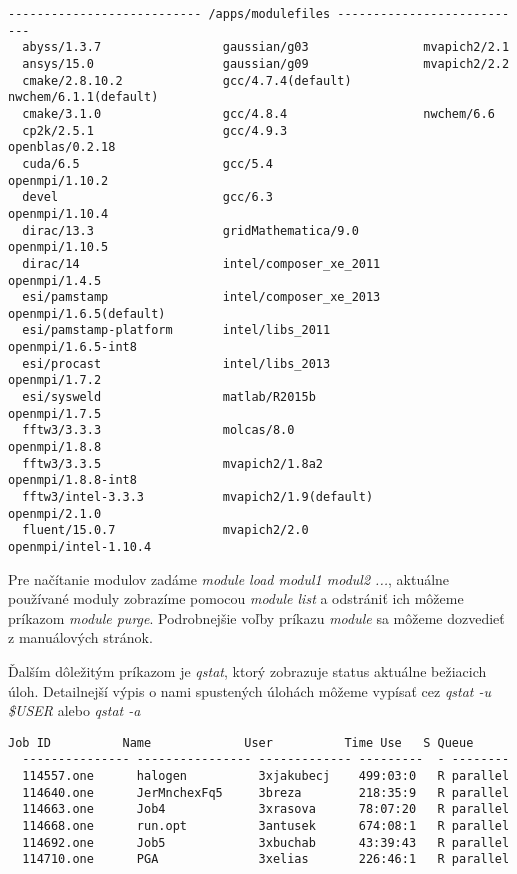 \begin{lstlisting}[caption={module avail}]
  --------------------------- /apps/modulefiles ---------------------------
  abyss/1.3.7                 gaussian/g03                mvapich2/2.1
  ansys/15.0                  gaussian/g09                mvapich2/2.2
  cmake/2.8.10.2              gcc/4.7.4(default)          nwchem/6.1.1(default)
  cmake/3.1.0                 gcc/4.8.4                   nwchem/6.6
  cp2k/2.5.1                  gcc/4.9.3                   openblas/0.2.18
  cuda/6.5                    gcc/5.4                     openmpi/1.10.2
  devel                       gcc/6.3                     openmpi/1.10.4
  dirac/13.3                  gridMathematica/9.0         openmpi/1.10.5
  dirac/14                    intel/composer_xe_2011      openmpi/1.4.5
  esi/pamstamp                intel/composer_xe_2013      openmpi/1.6.5(default)
  esi/pamstamp-platform       intel/libs_2011             openmpi/1.6.5-int8
  esi/procast                 intel/libs_2013             openmpi/1.7.2
  esi/sysweld                 matlab/R2015b               openmpi/1.7.5
  fftw3/3.3.3                 molcas/8.0                  openmpi/1.8.8
  fftw3/3.3.5                 mvapich2/1.8a2              openmpi/1.8.8-int8
  fftw3/intel-3.3.3           mvapich2/1.9(default)       openmpi/2.1.0
  fluent/15.0.7               mvapich2/2.0                openmpi/intel-1.10.4
\end{lstlisting}

Pre načítanie modulov zadáme \textit{module load modul1 modul2 ...}, aktuálne používané moduly zobrazíme pomocou
\textit{module list} a odstrániť ich môžeme príkazom \textit{module purge}.
Podrobnejšie voľby príkazu \textit{module} sa môžeme dozvedieť z manuálových stránok.

Ďalším dôležitým príkazom je \textit{qstat}, ktorý zobrazuje status aktuálne bežiacich úloh.
Detailnejší výpis o nami spustených úlohách môžeme vypísať cez \textit{qstat -u \$USER} alebo \textit{qstat -a}

\begin{lstlisting}[caption={qstat}]
  Job ID          Name             User          Time Use   S Queue
  --------------- ---------------- ------------- ---------  - --------
  114557.one      halogen          3xjakubecj    499:03:0   R parallel
  114640.one      JerMnchexFq5     3breza        218:35:9   R parallel
  114663.one      Job4             3xrasova      78:07:20   R parallel
  114668.one      run.opt          3antusek      674:08:1   R parallel
  114692.one      Job5             3xbuchab      43:39:43   R parallel
  114710.one      PGA              3xelias       226:46:1   R parallel
\end{lstlisting}

